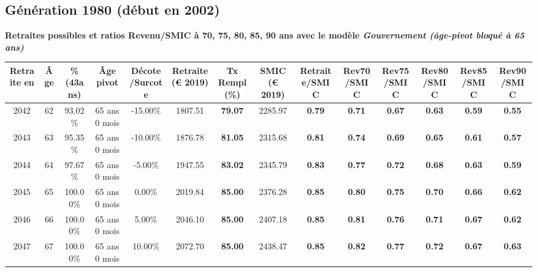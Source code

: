 \newpage 
 
\subsection{Génération 1980 (début en 2002)} 

{\bf \noindent Retraites possibles et ratios Revenu/SMIC à 70, 75, 80, 85, 90 ans avec le modèle \emph{Gouvernement (âge-pivot bloqué à 65 ans)}}  
 
\begin{adjustbox}{max width=\textwidth} 
\begin{tabular}[htb]{|c|c||c|c|c||c|c||c||c|c|c|c|c|c|} 
\hline 
 Retraite en &  Âge &  \%(43ans) &  Âge pivot &  Décote/Surcote &  Retraite (\euro{} 2019) &  Tx Rempl(\%) &  SMIC (\euro{} 2019) &  Retraite/SMIC &  Rev70/SMIC &  Rev75/SMIC &  Rev80/SMIC &  Rev85/SMIC &  Rev90/SMIC \\ 
\hline \hline 
 2042 &  62 &  93.02\% &  65 ans 0 mois &  -15.00\% &  1807.51 &  {\bf 79.07} &  2285.97 &  {\bf {\color{red} 0.79}} &  {\bf {\color{red} 0.71}} &  {\bf {\color{red} 0.67}} &  {\bf {\color{red} 0.63}} &  {\bf {\color{red} 0.59}} &  {\bf {\color{red} 0.55}} \\ 
\hline 
 2043 &  63 &  95.35\% &  65 ans 0 mois &  -10.00\% &  1876.78 &  {\bf 81.05} &  2315.68 &  {\bf {\color{red} 0.81}} &  {\bf {\color{red} 0.74}} &  {\bf {\color{red} 0.69}} &  {\bf {\color{red} 0.65}} &  {\bf {\color{red} 0.61}} &  {\bf {\color{red} 0.57}} \\ 
\hline 
 2044 &  64 &  97.67\% &  65 ans 0 mois &  -5.00\% &  1947.55 &  {\bf 83.02} &  2345.79 &  {\bf {\color{red} 0.83}} &  {\bf {\color{red} 0.77}} &  {\bf {\color{red} 0.72}} &  {\bf {\color{red} 0.68}} &  {\bf {\color{red} 0.63}} &  {\bf {\color{red} 0.59}} \\ 
\hline 
 2045 &  65 &  100.00\% &  65 ans 0 mois &  0.00\% &  2019.84 &  {\bf 85.00} &  2376.28 &  {\bf {\color{red} 0.85}} &  {\bf {\color{red} 0.80}} &  {\bf {\color{red} 0.75}} &  {\bf {\color{red} 0.70}} &  {\bf {\color{red} 0.66}} &  {\bf {\color{red} 0.62}} \\ 
\hline 
 2046 &  66 &  100.00\% &  65 ans 0 mois &  5.00\% &  2046.10 &  {\bf 85.00} &  2407.18 &  {\bf {\color{red} 0.85}} &  {\bf {\color{red} 0.81}} &  {\bf {\color{red} 0.76}} &  {\bf {\color{red} 0.71}} &  {\bf {\color{red} 0.67}} &  {\bf {\color{red} 0.62}} \\ 
\hline 
 2047 &  67 &  100.00\% &  65 ans 0 mois &  10.00\% &  2072.70 &  {\bf 85.00} &  2438.47 &  {\bf {\color{red} 0.85}} &  {\bf {\color{red} 0.82}} &  {\bf {\color{red} 0.77}} &  {\bf {\color{red} 0.72}} &  {\bf {\color{red} 0.67}} &  {\bf {\color{red} 0.63}} \\ 
\hline 
\hline 
\end{tabular} 
\end{adjustbox} 
 
